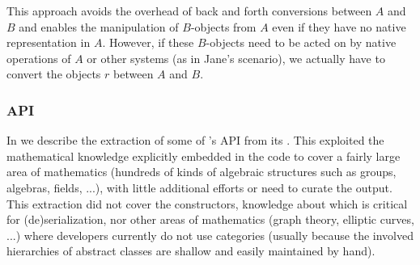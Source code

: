 This approach avoids the overhead of back and forth conversions between $A$ and $B$ and enables the manipulation of $B$-objects from $A$ even if they have no native representation in $A$.
However, if these $B$-objects need to be acted on by native operations of $A$ or other systems (as in Jane's scenario), we actually have to convert the objects $r$ between $A$ and $B$.


%

\subsubsection{API}

In \cite{DehKohKon:iop16} we describe the extraction of some of \Sage's API from its .
This exploited the mathematical knowledge explicitly embedded in the code to cover a fairly large area  of mathematics (hundreds of kinds of algebraic structures such as groups, algebras, fields, ...), with little additional efforts or need to curate the output.
This extraction did not cover the constructors, knowledge about
which is critical for (de)serialization, nor other areas of
mathematics (graph theory, elliptic curves, ...) where \Sage
developers currently do not use categories (usually because the
involved hierarchies of abstract classes are shallow and easily maintained by hand).

